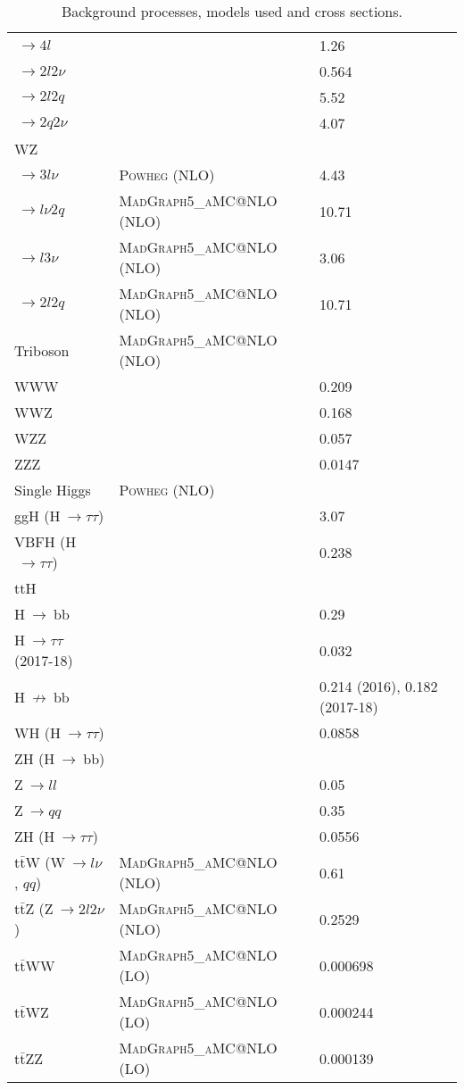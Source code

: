 \documentclass[../main.tex]{subfiles}
\begin{document}
\begin{table}[p]
\begin{footnotesize}
\begin{center}
\begin{tabular}{l | l | l}
		\quad$~\to 4l$ & & 1.26 \\
		\quad$~\to 2l2\nu$ & & 0.564 \\
		\quad$~\to 2l2q$ & & 5.52 \\
		\quad$~\to 2q2\nu$ & & 4.07 \\
\hline
		WZ & & \\
		\quad$~\to 3l\nu$ & \textsc{Powheg} (NLO) & 4.43 \\
		\quad$~\to l\nu2q$ & \textsc{MadGraph5\_aMC@NLO} (NLO) & 10.71 \\
		\quad$~\to l3\nu$ & \textsc{MadGraph5\_aMC@NLO} (NLO) & 3.06 \\
		\quad$~\to 2l2q$ & \textsc{MadGraph5\_aMC@NLO} (NLO) & 10.71 \\
\hline
		Triboson & \textsc{MadGraph5\_aMC@NLO} (NLO) & \\
		WWW &  & 0.209 \\
		WWZ &  & 0.168 \\
		WZZ &  & 0.057 \\
		ZZZ &  & 0.0147 \\
\hline
		Single Higgs & \textsc{Powheg} (NLO) & \\
		ggH (H$~\to\tau\tau$) & & 3.07 \\
		VBFH  (H$~\to\tau\tau$) & & 0.238 \\
		ttH & & \\
		\quad H$~\to~$bb & & 0.29 \\
		\quad H$~\to\tau\tau$ (2017-18) & & 0.032 \\
		\quad H$~\not\to~$bb & & 0.214 (2016), 0.182 (2017-18) \\
		WH (H$~\to\tau\tau$) & & 0.0858 \\
		ZH (H$~\to~$bb) & & \\
		\quad Z$~\to ll$ & & 0.05 \\
		\quad Z$~\to qq$ & & 0.35 \\
		ZH (H$~\to\tau\tau$) & & 0.0556\\
\hline
		$\text{t}\bar{\text{t}}$W (W$~\to l\nu$, $qq$) & \textsc{MadGraph5\_aMC@NLO} (NLO) & 0.61 \\
		$\text{t}\bar{\text{t}}$Z (Z$~\to 2l2\nu$) & \textsc{MadGraph5\_aMC@NLO} (NLO) & 0.2529 \\
		$\text{t}\bar{\text{t}}$WW & \textsc{MadGraph5\_aMC@NLO} (LO) & 0.000698 \\
		$\text{t}\bar{\text{t}}$WZ & \textsc{MadGraph5\_aMC@NLO} (LO) & 0.000244 \\
		$\text{t}\bar{\text{t}}$ZZ & \textsc{MadGraph5\_aMC@NLO} (LO) & 0.000139 \\
	\end{tabular}
\end{center}
\end{footnotesize}
\caption{Background processes, models used and cross sections.}
\label{hh:analysis:samples}
\end{table}
\end{document}
